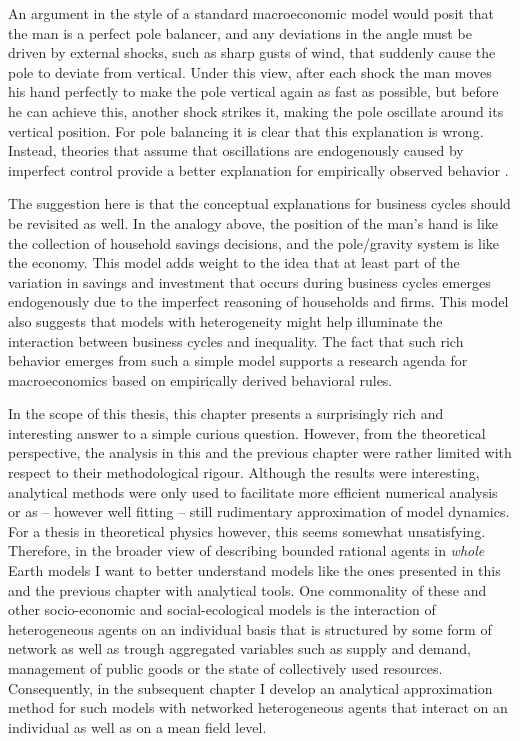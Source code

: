 An argument in the style of a standard macroeconomic model would posit that the man is a perfect pole balancer, and any deviations in the angle must be driven by external shocks, such as sharp gusts of wind, that suddenly cause the pole to deviate from vertical.  Under this view, after each shock the man moves his hand perfectly to make the pole vertical again as fast as possible, but before he can achieve this, another shock strikes it, making the pole oscillate around its vertical position.  For pole balancing it is clear that this explanation is wrong. Instead, theories that assume that oscillations are endogenously caused by imperfect control provide a better explanation for empirically observed behavior \citep{insperger2017stick}.

The suggestion here is that the conceptual explanations for business cycles should be revisited as well. In the analogy above, the position of the man's hand is like the collection of household savings decisions, and the pole/gravity system is like the economy.  This model adds weight to the idea that at least part of the variation in savings and investment that occurs during business cycles emerges endogenously due to the imperfect reasoning of households and firms.  This model also suggests that models with heterogeneity might help illuminate the interaction between business cycles and inequality.  The fact that such rich behavior emerges from such a simple model supports a research agenda for macroeconomics based on empirically derived behavioral rules.

In the scope of this thesis, this chapter presents a surprisingly rich and interesting answer to a simple curious question. However, from the theoretical perspective, the analysis in this and the previous chapter were rather limited with respect to their methodological rigour. Although the results were interesting, analytical methods were only used to facilitate more efficient numerical analysis or as -- however well fitting -- still rudimentary approximation of model dynamics. For a thesis in theoretical physics however, this seems somewhat unsatisfying. Therefore, in the broader view of describing bounded rational agents in \emph{whole} Earth models I want to better understand models like the ones presented in this and the previous chapter with analytical tools. One commonality of these and other socio-economic and social-ecological models is the interaction of heterogeneous agents on an individual basis that is structured by some form of network as well as trough aggregated variables such as supply and demand, management of public goods or the state of collectively used resources. Consequently, in the subsequent chapter I develop an analytical approximation method for such models with networked heterogeneous agents that interact on an individual as well as on a mean field level.
